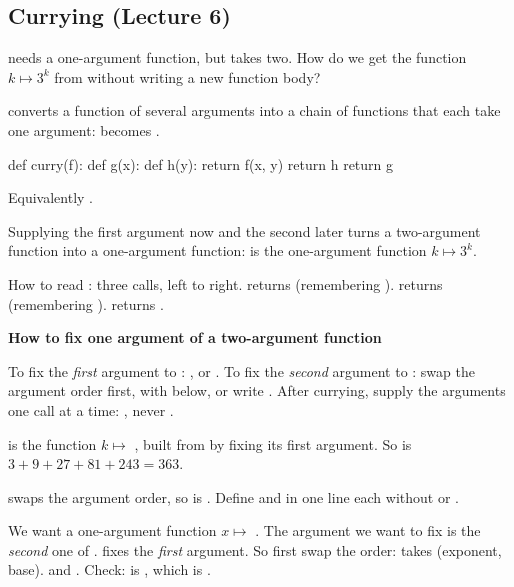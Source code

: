 \documentclass[10pt]{scrartcl}
\newenvironment{howto}[1]{\begin{mdframed}[style=howtostyle]{\color{NavyBlue}\textbf{#1}}\par\vspace{2pt}}{\end{mdframed}}
\begin{document}
\subsection{Currying (Lecture 6)}
\begin{qbox}
   needs a one-argument function, but  takes two. How do we get the function $k\mapsto 3^k$ from  without writing a new function body?
\end{qbox}
 converts a function of several arguments into a chain of functions that each take one argument:  becomes .
\begin{py}
def curry(f):
    def g(x):
        def h(y):
            return f(x, y)
        return h
    return g
\end{py}
Equivalently .
\begin{ideabox}
Supplying the first argument now and the second later turns a two-argument function into a one-argument function:  is the one-argument function $k\mapsto3^k$.

How to read : three calls, left to right.  returns  (remembering ).  returns  (remembering ).  returns .
\end{ideabox}
\begin{howto}{How to fix one argument of a two-argument function}
\begin{steps}
  \ii To fix the \emph{first} argument to : , or .
  \ii To fix the \emph{second} argument to : swap the argument order first,  with  below, or write .
  \ii After currying, supply the arguments one call at a time: , never .
\end{steps}
\end{howto}
\revisit {} is the function $k\mapsto$ , built from  by fixing its first argument. So  is $3+9+27+81+243=363$.

\begin{example*}
 swaps the argument order, so  is . Define  and  in one line each without  or \cd{**}.
\begin{steps}
  \ii We want a one-argument function $x\mapsto$ . The argument we want to fix is the \emph{second} one of .
  \ii {} fixes the \emph{first} argument. So first swap the order:  takes (exponent, base).
  \ii {} and . Check:  is , which is .
\end{steps}
\end{example*}
\end{document}
